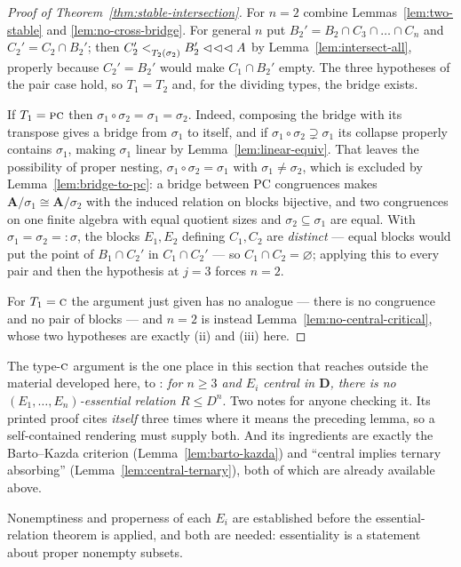 \begin{proof}[Proof of Theorem~\ref{thm:stable-intersection}]
For $n=2$ combine Lemmas~\ref{lem:two-stable} and \ref{lem:no-cross-bridge}.
For general $n$ put $B_{2}'=B_{2}\cap C_{3}\cap\dots\cap C_{n}$ and
$C_{2}'=C_{2}\cap B_{2}'$; then $C_{2}'<_{T_{2}(\sigma_{2})}^{}B_{2}'\mathrel{\lhd\!\lhd\!\lhd} A$ by
Lemma~\ref{lem:intersect-all}, properly because $C_{2}'=B_{2}'$ would make
$C_{1}\cap B_{2}'$ empty. The three hypotheses of the pair case hold, so
$T_{1}=T_{2}$ and, for the dividing types, the bridge exists.

If $T_{1}=\textup{\textsc{pc}}$ then $\sigma_{1}\circ\sigma_{2}=\sigma_{1}=\sigma_{2}$. Indeed,
composing the bridge with its transpose gives a bridge from $\sigma_{1}$ to
itself, and if $\sigma_{1}\circ\sigma_{2}\supsetneq\sigma_{1}$ its collapse
properly contains $\sigma_{1}$, making $\sigma_{1}$ linear by
Lemma~\ref{lem:linear-equiv}. That leaves the possibility of proper nesting,
$\sigma_{1}\circ\sigma_{2}=\sigma_{1}$ with $\sigma_{1}\neq\sigma_{2}$, which
is excluded by Lemma~\ref{lem:bridge-to-pc}: a bridge between PC congruences
makes $\mathbf A/\sigma_{1}\cong\mathbf A/\sigma_{2}$ with the induced relation
on blocks bijective, and two congruences on one finite algebra with equal
quotient sizes and $\sigma_{2}\subseteq\sigma_{1}$ are equal. With $\sigma_{1}=\sigma_{2}=:\sigma$, the blocks $E_{1},E_{2}$ defining
$C_{1},C_{2}$ are \emph{distinct} --- equal blocks would put the point of
$B_{1}\cap C_{2}'$ in $C_{1}\cap C_{2}'$ --- so $C_{1}\cap C_{2}=\varnothing$;
applying this to every pair and then the hypothesis at $j=3$ forces $n=2$.

For $T_{1}=\textup{\textsc{c}}$ the argument just given has no analogue --- there is no
congruence and no pair of blocks --- and $n=2$ is instead
Lemma~\ref{lem:no-central-critical}, whose two hypotheses are exactly (ii) and
(iii) here.
\end{proof}

\begin{hazard}\label{haz:d4}
The type-$\textup{\textsc{c}}$ argument is the one place in this section that reaches outside
the material developed here, to \cite[Lem.~6.11]{ZhukStrong}: \emph{for
$n\ge3$ and $E_{i}$ central in $\mathbf D$, there is no
$(E_{1},\dots,E_{n})$-essential relation $R\le D^{n}$}. Two notes for anyone
checking it. Its printed proof cites \emph{itself} three times where it means
the preceding lemma, so a self-contained rendering must supply both. And its
ingredients are exactly the Barto--Kazda criterion
(Lemma~\ref{lem:barto-kazda}) and ``central implies ternary absorbing''
(Lemma~\ref{lem:central-ternary}), both of which are already available above.

Nonemptiness and properness of each $E_{i}$ are established before the
essential-relation theorem is applied, and both are needed: essentiality is a
statement about proper nonempty subsets.
\end{hazard}

